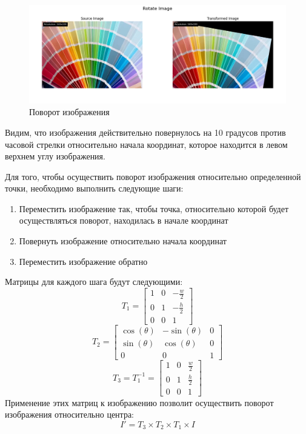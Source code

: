 \begin{figure}[ht]
    \includegraphics[width=\textwidth]{../results/Rotate Image.png}
    \caption{Поворот изображения}
    \label{fig:rotate_image}
\end{figure}

Видим, что изображения действительно повернулось на 10 градусов против часовой стрелки относительно начала координат, 
которое находится в левом верхнем углу изображения.

Для того, чтобы осуществить поворот изображения относительно определенной точки, необходимо выполнить следующие шаги:

\begin{enumerate}
    \item Переместить изображение так, чтобы точка, относительно которой будет осуществляться поворот, находилась в начале координат
    \item Повернуть изображение относительно начала координат
    \item Переместить изображение обратно
\end{enumerate}

Матрицы для каждого шага будут следующими:
\begin{equation}
T_1 = \begin{bmatrix}
    1 & 0 & -\frac{w}{2} \\
    0 & 1 & -\frac{h}{2} \\
    0 & 0 & 1
\end{bmatrix}
\end{equation}
\begin{equation}
T_2 = \begin{bmatrix}
    \cos(\theta) & -\sin(\theta) & 0 \\
    \sin(\theta) & \cos(\theta) & 0 \\
    0 & 0 & 1
\end{bmatrix}
\end{equation}
\begin{equation}
T_3 = T_1^{-1} = \begin{bmatrix}
    1 & 0 & \frac{w}{2} \\
    0 & 1 & \frac{h}{2} \\
    0 & 0 & 1
\end{bmatrix}
\end{equation}
Применение этих матриц к изображению позволит осуществить поворот изображения относительно центра:
\begin{equation}
    I' = T_3 \times T_2 \times T_1 \times I
\end{equation}

